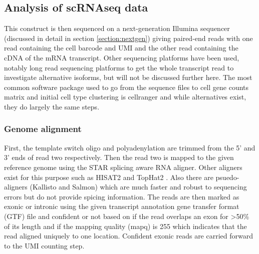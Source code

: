 \subsection{Analysis of scRNAseq data}

\par{
This construct is then sequenced on a next-generation Illumina sequencer \cite{bridgeamp}\cite{illuminareview} (discussed in detail in section \ref{section:nextgen}) giving paired-end reads with one read containing the cell barcode and UMI and the other read containing the cDNA of the mRNA transcript. Other sequencing platforms have been used, notably long read sequencing platforms to get the whole transcript read to investigate alternative isoforms, but will not be discussed further here\cite{tilgner}\cite{isoformseq}\cite{longreadsinglecell}. The most common software package used to go from the sequence files to cell gene counts matrix and initial cell type clustering is cellranger\cite{cellranger} and while alternatives exist\cite{dropseqsoft}, they do largely the same steps. 
}

\subsubsection{Genome alignment}

\par{
First, the template switch oligo and polyadenylation are trimmed from the 5' and 3' ends of read two respectively. Then the read two is mapped to the given reference genome using the STAR splicing aware RNA aligner\cite{STAR}. Other aligners exist for this purpose such as HISAT2 \cite{hisat} and TopHat2 \cite{tophat2}. Also there are psuedo-aligners (Kallisto\cite{kallisto} and Salmon\cite{salmon}) which are much faster and robust to sequencing errors but do not provide spicing information\cite{alignfree}. The reads are then marked as exonic or intronic using the given transcript annotation gene transfer format (GTF) file and confident or not based on if the read overlaps an exon for >50\% of its length and if the mapping quality (mapq) is 255 which indicates that the read aligned uniquely to one location. Confident exonic reads are carried forward to the UMI counting step\cite{singlecelloverview}.
}

